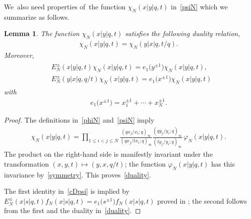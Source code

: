 \documentclass[pdftex]{sigma}%
\numberwithin{equation}{section}
\newtheorem{Lemma}[Theorem]{Lemma}
\begin{document}
We~also need properties of~the function $\chi_N(x|y|q,t)$ in~\eqref{psiN} which we summarize as follows.
\begin{Lemma}
\label{lem:psiN}
The function $\chi_N(x|y|q,t)$ satisfies the following duality relation,
\begin{gather}
\label{duality}
\chi_N(x|y|q,t)=\chi_N(y|x|q,t/q).
\end{gather}
Moreover,
\begin{gather}
\begin{split}
\label{cDpsi}
&E^\pm_N(x|y|q,t) \chi_N(x|y|q,t)=e_1\big(y^{\pm 1}\big) \chi_N(x|y|q,t),
\\[.5ex]
&E^\pm_N(y|x|q,q/t) \chi_N(x|y|q,t)=e_1\big(x^{\pm 1}\big) \chi_N(x|y|q,t)
\end{split}
\end{gather}
with
\begin{gather}
\label{e1}
e_1\big(x^{\pm 1}\big) = x_1^{\pm 1}+\cdots + x_N^{\pm 1}.
\end{gather}
\end{Lemma}
\begin{proof}The definitions in~\eqref{phiN} and~\eqref{psiN} imply
\begin{gather*}
\chi_N(x|y|q,t) = \prod_{1\leq i<j\leq N} \frac{(qx_j/x_i;q)_\infty}{(qx_j/tx_i;q)_\infty} \frac{(qy_j/y_i;q)_\infty}{(ty_j/y_i;q)_\infty} \, \varphi_N(x|y|q,t) .
\end{gather*}
The product on the right-hand side is manifestly invariant under the transformation $(x,y,t)\mapsto(y,x,q/t)$;
the function $\varphi_N(x|y|q,t)$ has this invariance by~\eqref{symmetry}. This proves~\eqref{duality}.

The first identity in~\eqref{cDpsi} is implied by $E^\pm_N(x|s|q,t)f_N(x|s|q,t)=e_1\big(s^{\pm 1}\big)f_N(x|s|q,t)$ proved in \cite{NS}; the second follows from the first and the duality in~\eqref{duality}.
\end{proof}
\end{document}
